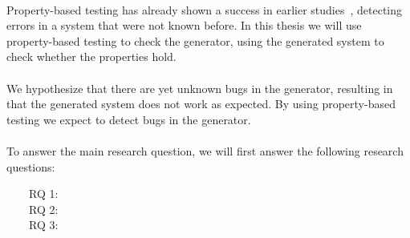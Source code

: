 \\
Property-based testing has already shown a success in earlier studies~\cite{fink1997property,claessen2011quickcheck,arts2006testing}, detecting errors in a system that were not known before. In this thesis we will use property-based testing to check the generator, using the generated system to check whether the properties hold.\\
\\
We hypothesize that there are yet unknown bugs in the generator, resulting in that the generated system does not work as expected. By using property-based testing we expect to detect bugs in the generator.\\
\\
To answer the main research question, we will first answer the following research questions:
\begin{description}
\item[~~~~RQ 1:] \rqOne
\item[~~~~RQ 2:] \rqTwo
\item[~~~~RQ 3:] \rqThree
\end{description}

